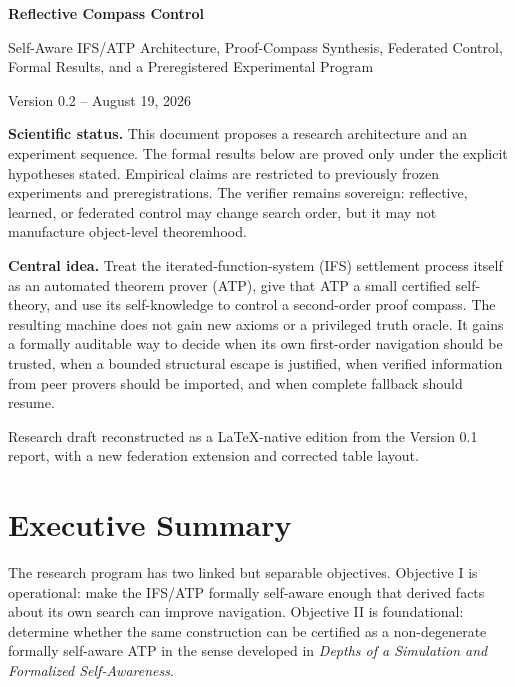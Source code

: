 \documentclass[11pt]{article}
\begin{document}
\begin{titlepage}
\thispagestyle{empty}
\vspace*{0.75in}
{\Huge\bfseries\color{ink} Reflective Compass Control\par}
\vspace{0.35em}
{\Large Self-Aware IFS/ATP Architecture, Proof-Compass Synthesis, Federated Control, Formal Results, and a Preregistered Experimental Program\par}
\vspace{1.1em}
{\large Version 0.2 -- August 19, 2026\par}
\vspace{1.4em}
\begin{statusbox}
\textbf{Scientific status.} This document proposes a research architecture and an experiment sequence. The formal results below are proved only under the explicit hypotheses stated. Empirical claims are restricted to previously frozen experiments and preregistrations. The verifier remains sovereign: reflective, learned, or federated control may change search order, but it may not manufacture object-level theoremhood.
\end{statusbox}
\vspace{1.1em}
\textbf{Central idea.} Treat the iterated-function-system (IFS) settlement process itself as an automated theorem prover (ATP), give that ATP a small certified self-theory, and use its self-knowledge to control a second-order proof compass. The resulting machine does not gain new axioms or a privileged truth oracle. It gains a formally auditable way to decide when its own first-order navigation should be trusted, when a bounded structural escape is justified, when verified information from peer provers should be imported, and when complete fallback should resume.
\vfill
\begin{center}
\small Research draft reconstructed as a LaTeX-native edition from the Version 0.1 report, with a new federation extension and corrected table layout.
\end{center}
\end{titlepage}

\tableofcontents
\newpage

\section{Executive Summary}
The research program has two linked but separable objectives. Objective I is operational: make the IFS/ATP formally self-aware enough that derived facts about its own search can improve navigation. Objective II is foundational: determine whether the same construction can be certified as a non-degenerate formally self-aware ATP in the sense developed in \emph{Depths of a Simulation and Formalized Self-Awareness}.
\end{document}
